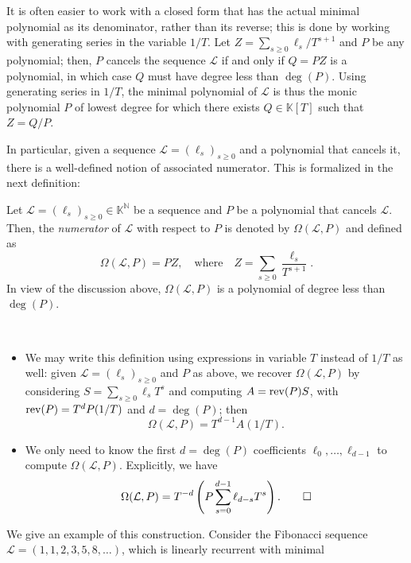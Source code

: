 \documentclass[12pt]{article}
\newcommand{\genseries}{Z}
\newcommand{\minpoly}{P}
\def\N {\ensuremath{\mathbb{N}}}
\def\K{\mathbb{K}}
\def\K {\ensuremath{\mathbb{K}}}
\begin{document}
It is often easier to work with a closed form that has the actual
minimal polynomial as its denominator, rather than its reverse; this
is done by working with generating series in the variable $1/T$.  Let
$\genseries = \sum_{s\ge0} \ell_s / T^{s+1}$ and $\minpoly$
be any polynomial; then, $\minpoly$ cancels the sequence $\mathcal{L}$
if and only if $Q=\minpoly \genseries $ is a polynomial, in which case $Q$
must have degree less than $\deg(\minpoly)$.  Using generating series in
$1/T$, the minimal polynomial of $\mathcal{L}$ is thus the
monic polynomial $\minpoly$ of lowest degree for which there exists $Q \in
\K[T]$ such that $\genseries=Q/\minpoly$.

In particular, given a sequence $\mathcal{L}=(\ell_s)_{s \ge 0}$ and a
polynomial that cancels it, there is a well-defined notion of
associated numerator.  This is formalized in the next definition:
\begin{definition}
  \label{def:omega}
  Let $\mathcal{L}=(\ell_s)_{s \ge 0}\in \K^\N$ be a sequence and $P$ be a
  polynomial that cancels $\mathcal{L}$. Then, the {\em numerator} of $\mathcal{L}$
  with respect to $P$ is denoted by $\Omega(\mathcal{L},P)$ and defined as 
  \[
    \Omega(\mathcal{L},P) = P \genseries, \quad\text{where}\quad
    \genseries=\sum_{s \ge 0} \frac {\ell_s}{T^{s+1}}.
  \]
  In view of the discussion above, $\Omega(\mathcal{L},P)$ is a polynomial of
  degree less than $\deg(P)$.
\end{definition}
\begin{remark} ~
  \begin{itemize}
  \item We may write this definition using expressions in
    variable $T$ instead of $1/T$ as well: given
    $\mathcal{L}=(\ell_s)_{s\ge0}$ and $P$ as above, we recover
    $\Omega(\mathcal{L},P)$ by considering $S=\sum_{s\ge 0} \ell_s
    T^s$ and computing $A = {\rm rev}(P) S$, with ${\rm rev}(P)=T^d
    P(1/T)$ and $d=\deg(P)$; then
    $$\Omega(\mathcal{L} ,P) = T^{d - 1} A (1/T).$$ 
\item We only need to know the first $d=\deg(P)$ coefficients
  $\ell_0,\dots,\ell_{d-1}$ to compute $\Omega(\mathcal{L}, P)$. Explicitly, we
  have
  \[
    \Omega(\mathcal{L},P) = T^{-d} \left( P \sum_{s=0}^{d-1} \ell_{d - s} T^s \right).
    \qedhere
  \]
 \end{itemize}
\end{remark}
We give an example of this construction. Consider the Fibonacci sequence
$\mathcal{L} = (1,1,2,3,5,8,\dots)$, which is linearly recurrent with minimal
\end{document}
